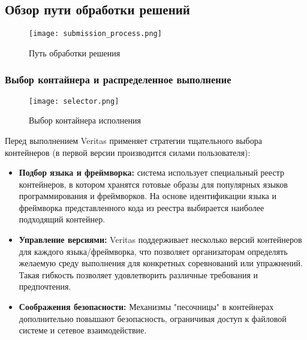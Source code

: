 



\subsection{Обзор пути обработки решений}
\begin{figure}[h]
    \centering
    \texttt{[image: submission\_process.png]}
    \caption{Путь обработки решения}
\end{figure}

\subsubsection{Выбор контайнера и распределенное выполнение}
\begin{figure}[h]
    \centering
    \texttt{[image: selector.png]}
    \caption{Выбор контайнера исполнения}
    \noindent
\end{figure}

\noindent
Перед выполнением Veritas применяет стратегии тщательного выбора контейнеров (в первой версии производится силами пользователя):
\begin{itemize}
    \itemsep 0em
    \item \textbf{Подбор языка и фреймворка:} система использует специальный реестр контейнеров, в котором хранятся готовые образы для популярных языков программирования и фреймворков. На основе идентификации языка и фреймворка представленного кода из реестра выбирается наиболее подходящий контейнер.
    \item \textbf{Управление версиями:} Veritas поддерживает несколько версий контейнеров для каждого языка/фреймворка, что позволяет организаторам определять желаемую среду выполнения для конкретных соревнований или упражнений. Такая гибкость позволяет удовлетворить различные требования и предпочтения.
    \item \textbf{Соображения безопасности:} Механизмы "песочницы" в контейнерах дополнительно повышают безопасность, ограничивая доступ к файловой системе и сетевое взаимодействие.
\end{itemize}

